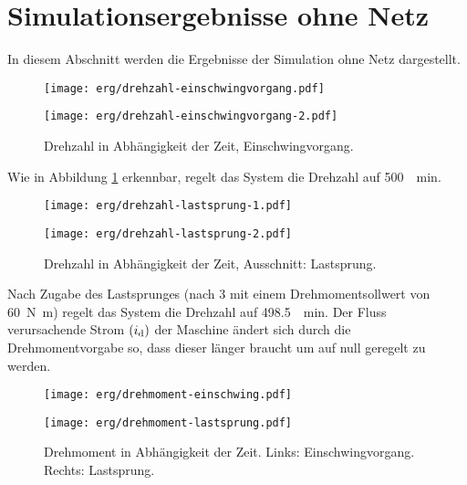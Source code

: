 \section{Simulationsergebnisse ohne Netz}\label{sec:sim-ohne-netz}

In diesem Abschnitt werden die Ergebnisse der Simulation ohne Netz dargestellt.

\begin{figure}[h!]
\begin{minipage}[t]{0.5\textwidth}
		\texttt{[image: erg/drehzahl-einschwingvorgang.pdf]}
\end{minipage}
\begin{minipage}[t]{0.5\textwidth}
		\texttt{[image: erg/drehzahl-einschwingvorgang-2.pdf]}
\end{minipage}
\caption{Drehzahl in Abhängigkeit der Zeit, Einschwingvorgang.}
\label{fig:drehzahl-einschwingvorgang}
\end{figure}

Wie in Abbildung \ref{fig:drehzahl-einschwingvorgang} erkennbar, regelt das System die Drehzahl auf \SI{500}{\per\minute}.

\begin{figure}[h!]
\begin{minipage}[t]{0.5\textwidth}
	\texttt{[image: erg/drehzahl-lastsprung-1.pdf]}
\end{minipage}
\begin{minipage}[t]{0.5\textwidth}
	\texttt{[image: erg/drehzahl-lastsprung-2.pdf]}
\end{minipage}
\caption{Drehzahl in Abhängigkeit der Zeit, Ausschnitt: Lastsprung.}
\label{fig:drehzahl-lastsprung}
\end{figure}
 
Nach Zugabe des Lastsprunges (nach \SI{3}{\sec} mit einem Drehmomentsollwert von \SI{60}{\newton\meter}) regelt das System die Drehzahl auf \SI{498.5}{\per\minute}.
Der Fluss verursachende Strom $(i_{\mathrm{d}})$ der Maschine ändert sich durch die Drehmomentvorgabe so, dass dieser länger braucht um auf null geregelt zu werden.
 

\begin{figure}[h!]
	\begin{minipage}[t]{0.5\textwidth}
		\texttt{[image: erg/drehmoment-einschwing.pdf]}
	\end{minipage}
	\begin{minipage}[t]{0.5\textwidth}
		\texttt{[image: erg/drehmoment-lastsprung.pdf]}
	\end{minipage}
	\caption{Drehmoment in Abhängigkeit der Zeit. Links: Einschwingvorgang. Rechts: Lastsprung.}
	\label{fig:drehmoment}
\end{figure}

